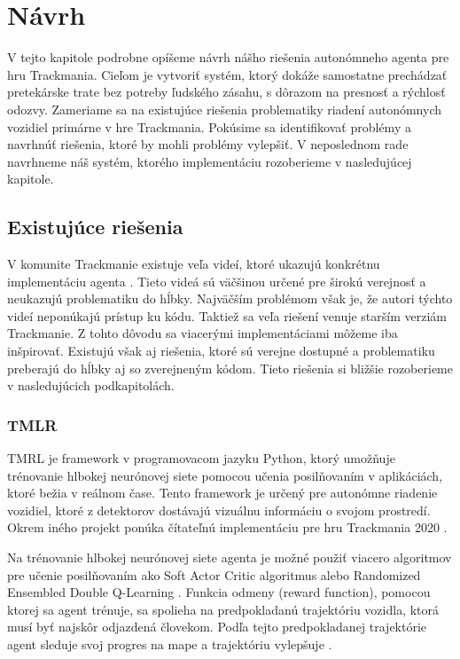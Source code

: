 \chapter{Návrh}
\label{kap:navrh}

V tejto kapitole podrobne opíšeme návrh nášho riešenia autonómneho agenta pre hru Trackmania. Cieľom je vytvoriť systém, ktorý dokáže samostatne prechádzať pretekárske trate bez potreby ľudského zásahu, s dôrazom na presnosť a rýchlosť odozvy. Zameriame sa na existujúce riešenia problematiky riadení autonómnych vozidiel primárne v hre Trackmania. Pokúsime sa identifikovať problémy a navrhnúť riešenia, ktoré by mohli problémy vylepšiť. V neposlednom rade navrhneme náš systém, ktorého implementáciu rozoberieme v nasledujúcej kapitole.

\section{Existujúce riešenia}
\label{sec:riesenia
}

V komunite Trackmanie existuje veľa videí, ktoré ukazujú konkrétnu implementáciu agenta \cite{yoshtm_youtube, linesight_rl_youtube}. Tieto videá sú väčšinou určené pre širokú verejnosť a neukazujú problematiku do hĺbky. Najväčším problémom však je, že autori týchto videí neponúkajú prístup ku kódu. Taktiež sa veľa riešení venuje starším verziám Trackmanie. Z tohto dôvodu sa viacerými implementáciami môžeme iba inšpirovať. Existujú však aj riešenia, ktoré sú verejne dostupné a problematiku preberajú do hĺbky aj so zverejneným kódom. Tieto riešenia si bližšie rozoberieme v nasledujúcich podkapitolách.

\subsection{TMLR}

TMRL je framework v programovacom jazyku Python, ktorý umožňuje trénovanie hlbokej neurónovej siete pomocou učenia posilňovaním v aplikáciách, ktoré bežia v reálnom čase. Tento framework je určený pre autonómne riadenie vozidiel, ktoré z detektorov dostávajú vizuálnu informáciu o svojom prostredí. Okrem iného projekt ponúka čítateľnú implementáciu pre hru Trackmania 2020 \cite{tmrl_github}.

Na trénovanie hlbokej neurónovej siete agenta je možné použiť viacero algoritmov pre učenie posilňovaním ako Soft Actor Critic algoritmus \cite{soft_actor_critic} alebo Randomized Ensembled Double Q-Learning \cite{randomized_q_learning}. Funkcia odmeny (reward function), pomocou ktorej sa agent trénuje, sa spolieha na predpokladanú trajektóriu vozidla, ktorá musí byť najskôr odjazdená človekom. Podľa tejto predpokladanej trajektórie agent sleduje svoj progres na mape a trajektóriu vylepšuje \cite{tmrl_github}.

